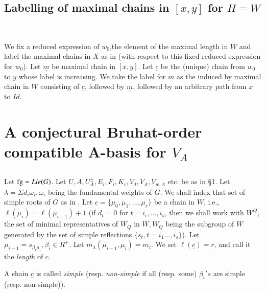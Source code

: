 \setcounter{subsection}{7}
\subsection{Labelling of maximal chains in \boldmath$[x,y]$ for $H=W$}\label{chap9-subsec-2.8}
~

\medskip
\noindent
 We fix a reduced expression of $w_{0}$,the element of the maximal length in $W$ and label the maximal chains in $X$ as in \cite{chap9-keyB-W}(with respect to this fixed reduced expression for $w_{0}$). Let $\underline{m}$ be maximal chain in $[x,y]$. Let $\underline{c}$ be the (unique) chain from  $w_{0}$ to $y$ whose label is increasing. We take the label for $\underline{m}$ as the induced by maximal chain in $W$ consisting of $\underline{c}$, followed by $\underline{m}$, followed by an arbitrary path from $x$ to $Id$.  

\section{A conjectural Bruhat-order compatible A-basis for $V_{A}$}\label{chap9-sec-3}
\pageoriginale

\subsection{}\label{chap9-subsec-3.1}
Let $\operatorname{fg} =Lie(G)$. Let $U, A, U_{A}^{\pm}, E_{i}, F_{i}, K_{i}, V_{d}, V_{A}, V_{w,A}$ etc. be as in \S1. Let $\lambda = \Sigma d_{i}\omega_{i}, \omega_{i}$ being the fundamental weights of $G$. We shall index that set of simple roots of $G$ as in \cite{chap9-keyB}. Let $\underline{c} = \{\mu_{0},\mu_{1}, \ldots, \mu_{r}\}$ be a chain in $W$, i.e., $\ell(\mu_{i})= \ell(\mu_{i-1}) +1$ (if $d_{t} =0$ for $t=i_{i}, \ldots, i_{s}$, then we shall work with $W^{Q}$, the set of minimal representatives of $W_{Q}$ in $W, W_{Q}$ being the subgroup of $W$ generated by the set of simple reflections $\{s_{t}, t=i_{1} \ldots, i_{s}\}$). Let $\mu_{i-1} = s_{\beta_{i}\mu_{i}}, \beta_{i} \in R^{+}$. Let $m_{\lambda}(\mu_{i-1}, \mu_{i}) =m_{i}$. We set $\ell(\underline{c}) = r$, and call it the \textit{length} of $\underline{c}$. 

\setcounter{definition}{1}
\begin{definition}\label{chap9-definition-3.2}
A chain $\underline{c}$ is called \textit{simple} (resp. \textit{non-simple} if all (resp. some) $\beta_{i}'s$ are simple (resp. non-simple)).
\end{definition}

